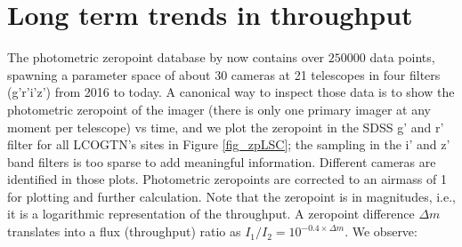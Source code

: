 \documentclass[]{spieman}
\begin{document}
\section{Long term trends in throughput}

The photometric zeropoint database by now contains over $250000$ data points, spawning a
parameter space of about 30 cameras at 21 telescopes in four filters (g'r'i'z') from 2016 to today.
A canonical way to inspect those data is to show the photometric zeropoint of the imager
(there is only one primary imager at any moment per telescope) vs time, and we plot the zeropoint in
the SDSS g' and r' filter for all LCOGTN's sites in Figure \ref{fig_zpLSC}; the sampling in the i' 
and z' band filters is too sparse to add meaningful information. Different cameras
are identified in those plots. Photometric zeropoints are corrected to an airmass of 1 for plotting 
and further calculation. Note that the zeropoint is in magnitudes, i.e., it is a logarithmic 
representation of the throughput. A zeropoint difference $\Delta m$ translates into a flux 
(throughput) ratio as $I_1 / I_2 = 10^{-0.4 \times \Delta m}$.  We observe:
\end{document}
